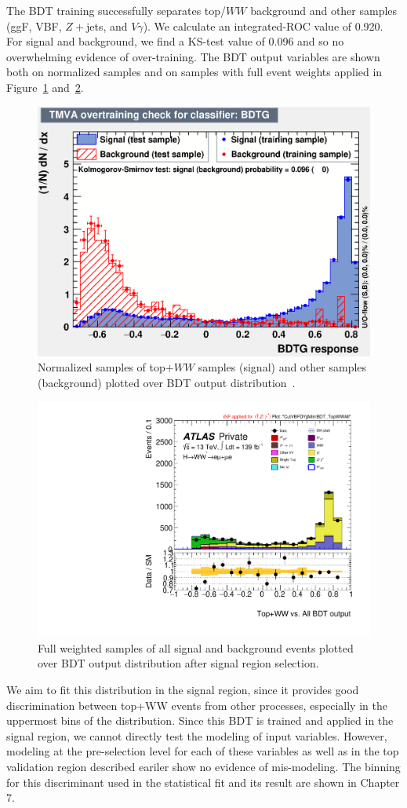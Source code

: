 The BDT training successfully separates top/$WW$ background and other samples (ggF, VBF, $Z+$jets, and $V\gamma$). We calculate an integrated-ROC value of 0.920. For signal and background, we find a KS-test value of 0.096 and so no overwhelming evidence of over-training. The BDT output variables are shown both on normalized samples and on samples with full event weights applied in Figure~\ref{fig:TopBDTresult} and~\ref{fig:TopBDTresult2}.

\begin{figure}[!htbp]
\centering
  \includegraphics[width=.45\linewidth]{Pictures/Top+WWvsEverything/overtrain_BDTG.eps}
\caption{Normalized samples of top$+WW$ samples (signal) and other samples (background) plotted over BDT output distribution~\cite{ourSupportNote}.}
\label{fig:TopBDTresult}
\end{figure}

\begin{figure}[!htbp]
\centering
  \includegraphics[width=.45\linewidth]{Pictures/run2-emme-CutVBFDYjjMin-BDT_TopWWAll-lin.pdf}
\caption{Full weighted samples of all signal and background events plotted over BDT output distribution after signal region selection.}
\label{fig:TopBDTresult2}
\end{figure}

We aim to fit this distribution in the signal region, since it provides good discrimination between top+WW events from other processes, especially in the uppermost bins of the distribution. Since this BDT is trained and applied in the signal region, we cannot directly test the modeling of input variables. However, modeling at the pre-selection level for each of these variables as well as in the top validation region described eariler show no evidence of mis-modeling. The binning for this discriminant used in the statistical fit and its result are shown in Chapter 7.

